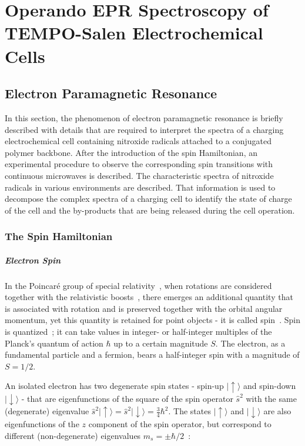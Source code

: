 \chapter{Operando EPR Spectroscopy of TEMPO-Salen Electrochemical Cells}

\section{Electron Paramagnetic Resonance}
In this section, the phenomenon of electron paramagnetic resonance is briefly described with details that are required to interpret the spectra of a charging electrochemical cell containing nitroxide radicals attached to a conjugated polymer backbone. After the introduction of the spin Hamiltonian, an experimental procedure to observe the corresponding spin transitions with continuous microwaves is described. The characteristic spectra of nitroxide radicals in various environments are described. That information is used to decompose the complex spectra of a charging cell to identify the state of charge of the cell and the by-products that are being released during the cell operation.

\subsection{The Spin Hamiltonian}
\label{sec:spin}
\paragraph*{Electron Spin}
In the Poincaré group of special relativity~\cite{poincare_1905}, when rotations are considered together with the relativistic boosts~\cite{einstein_s_rel}, there emerges an additional quantity that is associated with rotation and is preserved together with the orbital angular momentum, yet this quantity is retained for point objects - it is called spin~\cite{kuprov_2023}. Spin is quantized~\cite{SternGerlach1922}; it can take values in integer- or half-integer multiples of the Planck's quantum of action $\hbar$ up to a certain magnitude $S$. The electron, as a fundamental particle and a fermion, bears a half-integer spin with a magnitude of $S=1/2$. 

\par
An isolated electron has two degenerate spin states - spin-up $\vert{\uparrow}\rangle$ and spin-down $\vert{\downarrow}\rangle$ - that are eigenfunctions of the square of the spin operator $\hat{s}^2$ with the same (degenerate) eigenvalue $\hat{s}^2\vert{\uparrow}\rangle=\hat{s}^2\vert{\downarrow}\rangle=\frac{3}{4}\hbar^2$. The states $\vert{\uparrow}\rangle$ and $\vert{\downarrow}\rangle$ are also eigenfunctions of the $z$ component of the spin operator, but correspond to different (non-degenerate) eigenvalues $m_s=\pm\hbar/2$~\cite{Sakurai}: 

